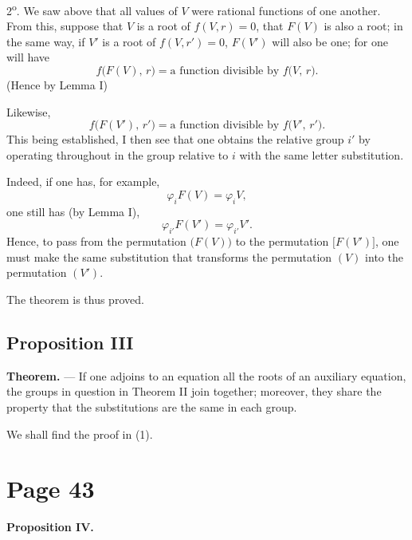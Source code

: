 \documentclass{article}
\begin{document}
2\textsuperscript{o}. We saw above that all values of $V$ were rational functions of one another. From this, suppose that $V$ is a root of $f(V,r)=0$, that $F(V)$ is also a root; in the same way, if $V'$ is a root of $f(V,r')=0$, $F(V')$ will also be one; for one will have
\[
f\bigl(F(V),\,r\bigr) = \text{a function divisible by } f\bigl(V,\,r\bigr).
\]
(Hence by Lemma I)

Likewise,
\[
f\bigl(F(V'),\,r'\bigr) = \text{a function divisible by } f\bigl(V',\,r'\bigr).
\]
This being established, I then see that one obtains the relative group $i'$ by operating throughout in the group relative to $i$ with the same letter substitution.

Indeed, if one has, for example,
\[
\varphi_{i} F(V) = \varphi_{i} V,
\]
one still has (by Lemma I),
\[
\varphi_{i'} F(V') = \varphi_{i'} V'.
\]
Hence, to pass from the permutation $\bigl(F(V)\bigr)$ to the permutation $\bigl[F(V')\bigr]$, one must make the same substitution that transforms the permutation $(V)$ into the permutation $(V')$.

The theorem is thus proved.

\subsection*{Proposition III}

\textbf{Theorem.} --- If one adjoins to an equation all the roots of an auxiliary equation, the groups in question in Theorem II join together; moreover, they share the property that the substitutions are the same in each group.

We shall find the proof in (1).


\section*{Page 43}

\textbf{Proposition IV.}
\end{document}
